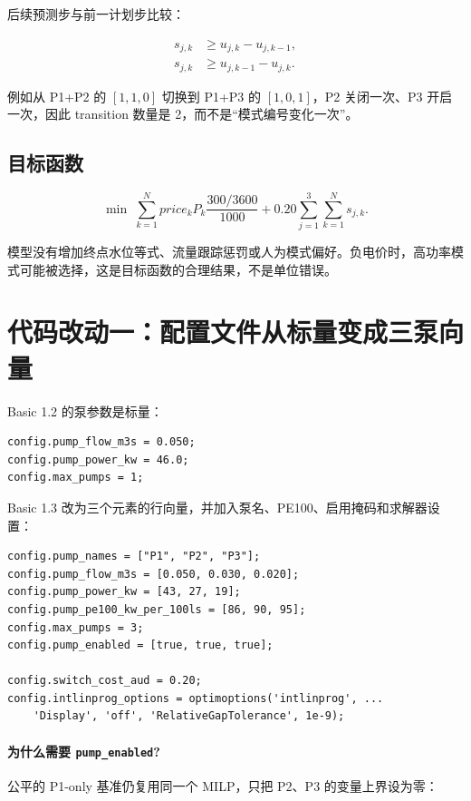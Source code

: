 \documentclass[UTF8,a4paper,11pt]{ctexart}
\newcommand{\code}[1]{\texttt{#1}}
\begin{document}
后续预测步与前一计划步比较：

\begin{align}
s_{j,k}&\ge u_{j,k}-u_{j,k-1},\\
s_{j,k}&\ge u_{j,k-1}-u_{j,k}.
\end{align}

例如从 P1+P2 的 $[1,1,0]$ 切换到 P1+P3 的 $[1,0,1]$，P2 关闭一次、P3 开启一次，因此 transition 数量是 2，而不是“模式编号变化一次”。

\subsection{目标函数}

\begin{equation}
\min\;\sum_{k=1}^{N} price_kP_k\frac{300/3600}{1000}
+0.20\sum_{j=1}^{3}\sum_{k=1}^{N}s_{j,k}.
\end{equation}

模型没有增加终点水位等式、流量跟踪惩罚或人为模式偏好。负电价时，高功率模式可能被选择，这是目标函数的合理结果，不是单位错误。

\section{代码改动一：配置文件从标量变成三泵向量}

Basic 1.2 的泵参数是标量：

\begin{lstlisting}[caption={Basic 1.2：单泵配置}]
config.pump_flow_m3s = 0.050;
config.pump_power_kw = 46.0;
config.max_pumps = 1;
\end{lstlisting}

Basic 1.3 改为三个元素的行向量，并加入泵名、PE100、启用掩码和求解器设置：

\begin{lstlisting}[caption={Basic 1.3：三泵配置}]
config.pump_names = ["P1", "P2", "P3"];
config.pump_flow_m3s = [0.050, 0.030, 0.020];
config.pump_power_kw = [43, 27, 19];
config.pump_pe100_kw_per_100ls = [86, 90, 95];
config.max_pumps = 3;
config.pump_enabled = [true, true, true];

config.switch_cost_aud = 0.20;
config.intlinprog_options = optimoptions('intlinprog', ...
    'Display', 'off', 'RelativeGapTolerance', 1e-9);
\end{lstlisting}

\paragraph{为什么需要 \code{pump\_enabled}?}
公平的 P1-only 基准仍复用同一个 MILP，只把 P2、P3 的变量上界设为零：
\end{document}
